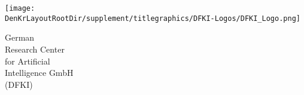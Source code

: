 %
%
%
\begin{minipage}{0.4\textwidth}%
\begin{flushleft}%
\texttt{[image: \\DenKrLayoutRootDir/supplement/titlegraphics/DFKI-Logos/DFKI\_Logo.png]}%
\textsc{\Large }%
\end{flushleft}%
\end{minipage}%
\hfill%
\begin{minipage}{0.5\textwidth}%
\begin{flushright}%
{\Large {}\selectfont German}\\%
{\Large {}\selectfont Research Center}\\%
{\Large {}\selectfont for Artificial}\\%
{\Large {}\selectfont Intelligence GmbH}\\%
{\Large {}\selectfont (DFKI)}%
\end{flushright}%
\end{minipage}%
%
\vspace*{0.05\textheight}%
%

%

%
%